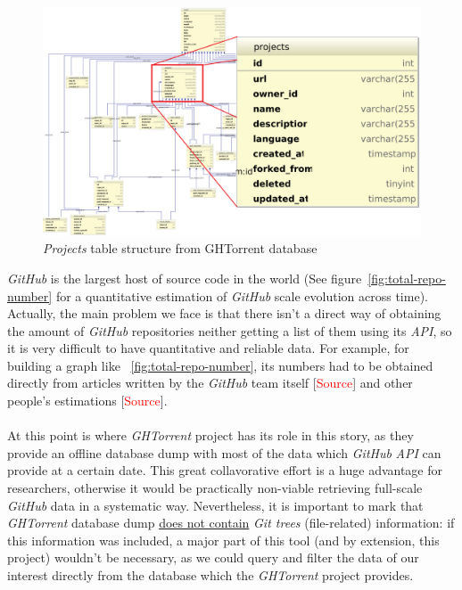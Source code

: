\documentclass[a4paper, 12pt]{book}
\begin{document}
\begin{figure}
  \centering
  \includegraphics[width=16cm, keepaspectratio]{img/ghtorrent-schema-detail}
  \caption{\textit{Projects} table structure from GHTorrent database}
  \label{fig:ghtorrent-schema-detail}
\end{figure}
\emph{GitHub} is the largest host of source code in the world (See figure~\ref{fig:total-repo-number} for a quantitative
estimation of \emph{GitHub} scale evolution across time). Actually, the main problem we face is that there isn't a direct way
of obtaining the amount of \emph{GitHub} repositories neither getting a list of them using its \textit{API}, so it is
very difficult to have quantitative and reliable data. For example, for building a graph like ~\ref{fig:total-repo-number},
its numbers had to be obtained directly from articles written by the \emph{GitHub} team itself [\textcolor{red}{Source}]
and other people's estimations [\textcolor{red}{Source}].\\\\
At this point is where \emph{GHTorrent} project has its role in this story, as they provide an offline database dump with most
of the data which \emph{GitHub} \textit{API} can provide at a certain date. This great collavorative effort is a huge advantage
for researchers, otherwise it would be practically non-viable retrieving full-scale \emph{GitHub} data in a systematic way.
Nevertheless, it is important to mark that \emph{GHTorrent} database dump \underline{does not contain} \textit{Git trees}
(file-related) information: if this information was included, a major part of this tool (and by extension, this project) wouldn't
be necessary, as we could query and filter the data of our interest directly from the database which the \emph{GHTorrent} project provides.\\
\end{document}
